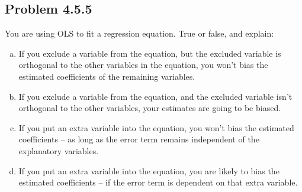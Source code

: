 \documentclass{amsart}\usepackage[]{graphicx}\usepackage[]{color}
\begin{document}
		\subsection*{Problem 4.5.5} %
		\label{ssub:problem_4_5_5}
			You are using OLS to fit a regression equation.
			True or false, and explain:
			\begin{enumerate}[(a)]
				\item If you exclude a variable from the equation, but the excluded variable is orthogonal to the other variables in the equation, you won’t bias the estimated coefficients of the remaining variables.
				\item If you exclude a variable from the equation, and the excluded variable isn’t orthogonal to the other variables, your estimates are going to be biased.
				\item  If you put an extra variable into the equation, you won't bias the estimated coefficients -- as long as the error term remains independent of the explanatory variables.
				\item If you put an extra variable into the equation, you are likely to bias the estimated coefficients -- if the error term is dependent on that extra variable.
			\end{enumerate}
\end{document}
